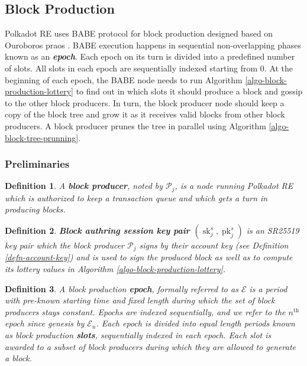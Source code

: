 \documentclass{article}
\newcommand{\tmem}[1]{{\em #1\/}}
\newcommand{\tmop}[1]{\ensuremath{\operatorname{#1}}}
\newcommand{\tmstrong}[1]{\textbf{#1}}
\newcommand{\tmtextbf}[1]{{\bfseries{#1}}}
\newcommand{\tmtextit}[1]{{\itshape{#1}}}
\newtheorem{definition}{Definition}
\providecommand{\tmem}[1]{\tmtextit{#1}}
\providecommand{\tmop}[1]{\ensuremath{\mathrm{#1}}}
\providecommand{\tmstrong}[1]{\tmtextbf{#1}}
\providecommand{\tmtextbf}[1]{\tmtextbf{#1}}
\providecommand{\tmtextit}[1]{\tmtextit{#1}}
\newtheorem{definition}{Definition}
\begin{document}
\subsection{Block Production}

Polkadot RE uses BABE protocol {\cite{w3f_research_group_blind_2019}} for
block production designed based on Ouroboros praos
{\cite{david_ouroboros_2018}}. BABE execution happens in sequential
non-overlapping phases known as an {\tmstrong{{\tmem{epoch}}}}. Each epoch on
its turn is divided into a predefined number of slots. All slots in each epoch
are sequentially indexed starting from 0. At the beginning of each epoch, the
BABE node needs to run Algorithm \ref{algo-block-production-lottery} to find
out in which slots it should produce a block and gossip to the other block
producers. In turn, the block producer node should keep a copy of the block
tree and grow it as it receives valid blocks from other block producers. A
block producer prunes the tree in parallel using Algorithm
\ref{algo-block-tree-prunning}.

\subsubsection{Preliminaries}

\begin{definition}
  A {\tmstrong{block producer}}, noted by $\mathcal{P}_j$, is a node running
  Polkadot RE which is authorized to keep a transaction queue and which gets a
  turn in producing blocks.
\end{definition}

\begin{definition}
  {\tmstrong{Block authring session key pair $(\tmop{sk}^s_j,
  \tmop{pk}^s_j)$}} is an SR25519 key pair which the block producer
  $\mathcal{P}_j$ signs by their account key (see Definition
  \ref{defn-account-key}) and is used to sign the produced block as well as to
  compute its lottery values in Algorithm \ref{algo-block-production-lottery}.
  
\end{definition}

\begin{definition}
  A block production {\tmstrong{epoch}}, formally referred to as $\mathcal{E}$
  is a period with pre-known starting time and fixed length during which the
  set of block producers stays constant. Epochs are indexed sequentially, and
  we refer to the $n^{\tmop{th}}$ epoch since genesis by $\mathcal{E}_n$. Each
  epoch is divided into equal length periods known as block production
  {\tmstrong{slots}}, sequentially indexed in each epoch. Each slot is awarded
  to a subset of block producers during which they are allowed to generate a
  block.
\end{definition}
\end{document}
